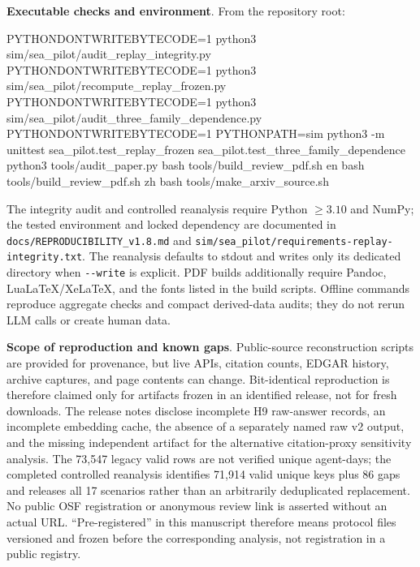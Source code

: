\documentclass[
  11pt]{article}
\newenvironment{Shaded}{}{}
\newcommand{\AttributeTok}[1]{\textcolor[rgb]{0.49,0.56,0.16}{#1}}
\newcommand{\ExtensionTok}[1]{#1}
\newcommand{\FunctionTok}[1]{\textcolor[rgb]{0.02,0.16,0.49}{#1}}
\newcommand{\NormalTok}[1]{#1}
\newcommand{\OperatorTok}[1]{\textcolor[rgb]{0.40,0.40,0.40}{#1}}
\newcommand{\VariableTok}[1]{\textcolor[rgb]{0.10,0.09,0.49}{#1}}
\begin{document}
\textbf{Executable checks and environment}. From the repository root:

\begin{Shaded}
\begin{Highlighting}[]
\VariableTok{PYTHONDONTWRITEBYTECODE}\OperatorTok{=}\NormalTok{1 }\ExtensionTok{python3}\NormalTok{ sim/sea\_pilot/audit\_replay\_integrity.py}
\VariableTok{PYTHONDONTWRITEBYTECODE}\OperatorTok{=}\NormalTok{1 }\ExtensionTok{python3}\NormalTok{ sim/sea\_pilot/recompute\_replay\_frozen.py}
\VariableTok{PYTHONDONTWRITEBYTECODE}\OperatorTok{=}\NormalTok{1 }\ExtensionTok{python3}\NormalTok{ sim/sea\_pilot/audit\_three\_family\_dependence.py}
\VariableTok{PYTHONDONTWRITEBYTECODE}\OperatorTok{=}\NormalTok{1 }\VariableTok{PYTHONPATH}\OperatorTok{=}\NormalTok{sim }\ExtensionTok{python3} \AttributeTok{{-}m}\NormalTok{ unittest sea\_pilot.test\_replay\_frozen sea\_pilot.test\_three\_family\_dependence}
\ExtensionTok{python3}\NormalTok{ tools/audit\_paper.py}
\FunctionTok{bash}\NormalTok{ tools/build\_review\_pdf.sh en}
\FunctionTok{bash}\NormalTok{ tools/build\_review\_pdf.sh zh}
\FunctionTok{bash}\NormalTok{ tools/make\_arxiv\_source.sh}
\end{Highlighting}
\end{Shaded}

The integrity audit and controlled reanalysis require Python \(\ge3.10\)
and NumPy; the tested environment and locked dependency are documented
in \texttt{docs/REPRODUCIBILITY\_v1.8.md} and
\texttt{sim/sea\_pilot/requirements-replay-integrity.txt}. The
reanalysis defaults to stdout and writes only its dedicated directory
when \texttt{-\/-write} is explicit. PDF builds additionally require
Pandoc, LuaLaTeX/XeLaTeX, and the fonts listed in the build scripts.
Offline commands reproduce aggregate checks and compact derived-data
audits; they do not rerun LLM calls or create human data.

\textbf{Scope of reproduction and known gaps}. Public-source
reconstruction scripts are provided for provenance, but live APIs,
citation counts, EDGAR history, archive captures, and page contents can
change. Bit-identical reproduction is therefore claimed only for
artifacts frozen in an identified release, not for fresh downloads. The
release notes disclose incomplete H9 raw-answer records, an incomplete
embedding cache, the absence of a separately named raw v2 output, and
the missing independent artifact for the alternative citation-proxy
sensitivity analysis. The 73,547 legacy valid rows are not verified
unique agent-days; the completed controlled reanalysis identifies 71,914
valid unique keys plus 86 gaps and releases all 17 scenarios rather than
an arbitrarily deduplicated replacement. No public OSF registration or
anonymous review link is asserted without an actual URL.
``Pre-registered'' in this manuscript therefore means protocol files
versioned and frozen before the corresponding analysis, not registration
in a public registry.
\end{document}
